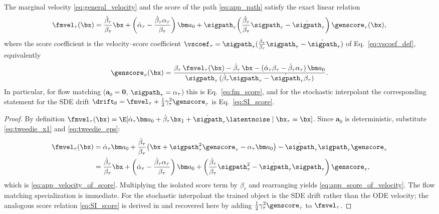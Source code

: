 \begin{proposition}\label{prop:score_velocity}
The marginal velocity \eqref{eq:general_velocity} and the score of the path \eqref{eq:app_path} satisfy the exact linear relation
\begin{align}\label{eq:app_velocity_of_score}
    \fmvel_\tau(\bx)
    = \frac{\dot\beta_\tau}{\beta_\tau}\bx
    + \left(\dot\alpha_\tau - \frac{\dot\beta_\tau\alpha_\tau}{\beta_\tau}\right)\bm a_0
    + \sigpath_\tau\!\left(\frac{\dot\beta_\tau}{\beta_\tau}\sigpath_\tau - \dot\sigpath_\tau\right)\genscore_\tau(\bx),
\end{align}
where the score coefficient is the velocity--score coefficient $\vscoef_\tau=\sigpath_\tau(\tfrac{\dot\beta_\tau}{\beta_\tau}\sigpath_\tau-\dot\sigpath_\tau)$ of Eq.~\eqref{eq:vscoef_def}, equivalently
\begin{align}\label{eq:app_score_of_velocity}
    \genscore_\tau(\bx)
    = \frac{\beta_\tau\,\fmvel_\tau(\bx) - \dot\beta_\tau\,\bx - (\dot\alpha_\tau\beta_\tau - \dot\beta_\tau\alpha_\tau)\,\bm a_0}
           {\sigpath_\tau\,(\dot\beta_\tau\sigpath_\tau - \dot\sigpath_\tau\beta_\tau)} .
\end{align}
In particular, for flow matching ($\bm a_0=\bm 0$, $\sigpath_\tau=\alpha_\tau$) this is Eq.~\eqref{eq:fm_score}, and for the stochastic interpolant the corresponding statement for the SDE drift $\drift_\theta=\fmvel_\tau+\tfrac12\gamma_\tau^2\genscore_\tau$ is Eq.~\eqref{eq:SI_score}.
\end{proposition}
\begin{proof}
By definition $\fmvel_\tau(\bx)=\E[\dot\alpha_\tau\bm a_0 + \dot\beta_\tau\bx_1 + \dot\sigpath_\tau\latentnoise\mid\bx_\tau=\bx]$. Since $\bm a_0$ is deterministic, substitute \eqref{eq:tweedie_x1} and \eqref{eq:tweedie_eps}:
\begin{align}
    \fmvel_\tau(\bx)
    &= \dot\alpha_\tau\bm a_0
    + \frac{\dot\beta_\tau}{\beta_\tau}\!\left(\bx + \sigpath_\tau^2\genscore_\tau - \alpha_\tau\bm a_0\right)
    - \dot\sigpath_\tau\sigpath_\tau\genscore_\tau \nonumber\\
    &= \frac{\dot\beta_\tau}{\beta_\tau}\bx
    + \left(\dot\alpha_\tau - \frac{\dot\beta_\tau\alpha_\tau}{\beta_\tau}\right)\bm a_0
    + \left(\frac{\dot\beta_\tau}{\beta_\tau}\sigpath_\tau^2 - \dot\sigpath_\tau\sigpath_\tau\right)\genscore_\tau,
\end{align}
which is \eqref{eq:app_velocity_of_score}. Multiplying the isolated score term by $\beta_\tau$ and rearranging yields \eqref{eq:app_score_of_velocity}. The flow matching specialization is immediate. For the stochastic interpolant the trained object is the SDE drift rather than the ODE velocity; the analogous score relation \eqref{eq:SI_score} is derived in \cite{chen_probabilistic_2024} and recovered here by adding $\tfrac12\gamma_\tau^2\genscore_\tau$ to $\fmvel_\tau$.
\end{proof}

